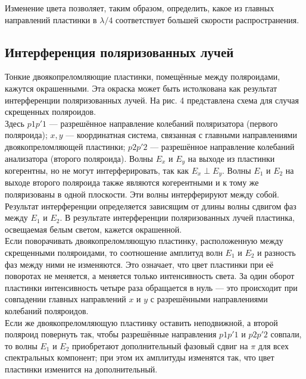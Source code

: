 Изменение цвета позволяет, таким образом, определить, какое из главных направлений пластинки
в $ \lambda/4 $ соответствует большей скорости распространения.

\subsection{Интерференция поляризованных лучей}


Тонкие двоякопреломляющие пластинки, помещённые между поляроидами, кажутся окрашенными. Эта окраска может быть истолкована как результат интерференции поляризованных лучей. На рис. 4 представлена схема для
случая скрещенных поляроидов. \\

Здесь $ p1p'1 $ --- разрешённое направление колебаний поляризатора
(первого поляроида); $ x, y $ --- координатная система, связанная с главными направлениями
двоякопреломляющей пластинки; $ p2p'2 $ --- разрешённое направление колебаний анализатора
(второго поляроида). Волны $ E_x  $ и $ E_y $ на выходе из пластинки когерентны, но не могут
интерферировать, так как $ E_x \perp  E_y $. Волны $ E_1 $ и $ E_2 $ на выходе второго
поляроида также являются когерентными и к тому же поляризованы в одной плоскости. Эти волны
интерферируют между собой. Результат интерференции определяется зависящим от длины волны
сдвигом фаз между $ E_1 $ и $ E_2 $. В результате интерференции поляризованных лучей
пластинка, освещаемая белым светом, кажется окрашенной. \\

Если поворачивать двоякопреломляющую пластинку, расположенную между скрещенными поляроидами,
то соотношение амплитуд волн $ E_1 $ и $ E_2 $ и разность фаз между ними не изменяются.
Это означает, что цвет пластинки при её поворотах не меняется, а меняется только
интенсивность света. За один оборот пластинки интенсивность четыре раза обращается в нуль
--- это происходит при совпадении главных направлений $ x $ и $ y $ с разрешёнными
направлениями колебаний поляроидов. \\

Если же двоякопреломляющую пластинку оставить неподвижной, а второй поляроид повернуть так,
чтобы разрешённые направления $ p1p'1 $ и $ p2p'2 $ совпали, то волны $ E_1 $ и $ E_2 $
приобретают дополнительный фазовый сдвиг на $ \pi $ для всех спектральных компонент;
при этом их амплитуды изменятся так, что цвет пластинки изменится на дополнительный. 

